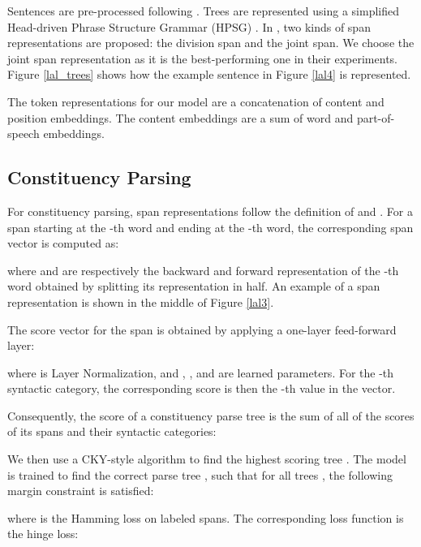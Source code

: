 \documentclass[11pt,a4paper]{article}
\begin{document}
Sentences are pre-processed following \citet{zhou2019head}. Trees are represented using a simplified Head-driven Phrase Structure Grammar (HPSG) \cite{pollard1994head}. In \citet{zhou2019head},   two kinds of span representations are proposed: the division span and the joint span. We choose the joint span representation as it is the best-performing one in their experiments.  Figure \ref{lal_trees} shows how the example sentence in Figure \ref{lal4} is represented.

The token representations for our model are a concatenation of content and position embeddings. The content embeddings are a sum of word and part-of-speech embeddings.

\subsection{Constituency Parsing}

For constituency parsing, span representations follow the definition of \citet{gaddy2018s} and \citet{kitaev2018constituency}. For a span starting at the -th word and ending at the -th word, the corresponding span vector  is computed as:



\noindent where  and  are respectively the backward and forward representation of the -th word obtained by splitting its representation in half. An example of a span representation is shown in the middle of Figure \ref{lal3}.

The score vector for the span is obtained by applying a one-layer feed-forward layer:



\noindent where  is Layer Normalization, and , ,  and  are learned parameters. For the -th syntactic category, the corresponding score  is then the -th value in the  vector.

Consequently, the score of a constituency parse tree  is the sum of all of the scores of its spans and their syntactic categories:



We then use a CKY-style algorithm \cite{stern2017minimal, gaddy2018s} to find the highest scoring tree . The model is trained to find the correct parse tree , such that for all trees , the following margin constraint is satisfied:



\noindent where  is the Hamming loss on labeled spans. The corresponding loss function is the hinge loss:
\end{document}
